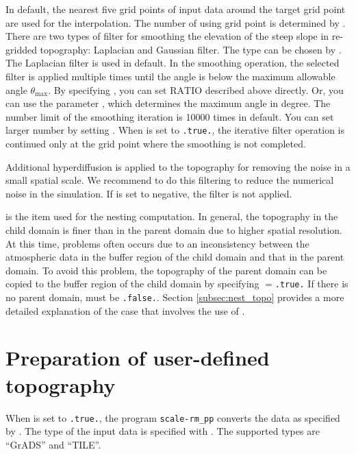 In default, the nearest five grid points of input data around the target grid point are used for the interpolation. The number of using grid point is determined by .
There are two types of filter for smoothing the elevation of the steep slope in re-gridded topography: Laplacian and Gaussian filter.
The type can be chosen by . The Laplacian filter is used in default.
In the smoothing operation, the selected filter is applied multiple times until the angle is below the maximum allowable angle $\theta_{\max}$.
By specifying , you can set $\mathrm{RATIO}$ described above directly. Or, you can use the parameter , which determines the maximum angle in degree.
The number limit of the smoothing iteration is 10000 times in default. You can set larger number by setting .
When  is set to \verb|.true.|, the iterative filter operation is continued only at the grid point where the smoothing is not completed.

Additional hyperdiffusion is applied to the topography for removing the noise in a small spatial scale. We recommend to do this filtering to reduce the numerical noise in the simulation.
If  is set to negative, the filter is not applied.

 is the item used for the nesting computation.
In general, the topography in the child domain is finer than in the parent domain due to higher spatial resolution.
At this time, problems often occurs due to
an inconsistency between
the atmospheric data in the buffer region of the child domain and that in the parent domain.
To avoid this problem, the topography of the parent domain can be copied to the buffer region of the child domain by specifying $=$\verb|.true.| If there is no parent domain,  must be \verb|.false.|. Section \ref{subsec:nest_topo} provides a more detailed explanation of the case that involves the use of .



\section{Preparation of user-defined topography} \label{subsec:topo_userfile}

When  is set to \verb|.true.|, the program \verb|scale-rm_pp| converts the data as specified by .
The type of the input data is specified with .
The supported types are ``GrADS'' and ``TILE''.

